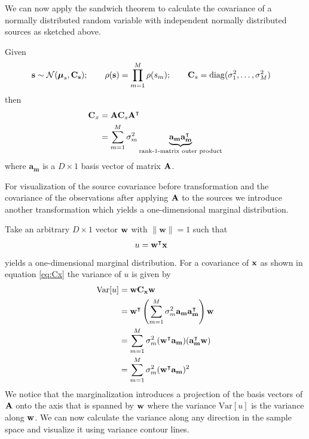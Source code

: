 \noindent We can now apply the sandwich theorem to calculate the covariance of a normally distributed random
variable with independent normally distributed sources as sketched above.
\begin{proposition}
Given
	\begin{align*}
		\mathbf{s} \sim \mathcal{N}(\mathbf{\boldsymbol \mu}_s,\mathbf{C_s}); \qquad
		\rho(\mathbf{s}) = \prod_{m=1}^M \rho(s_m); \qquad
		\mathbf{C}_s = \mathrm{diag}(\sigma_1^2, \dots ,\sigma_M^2) &
	\end{align*}
then
	\begin{align}
		\begin{split}
		\mathbf{C}_x &= \mathbf{A} \mathbf{C}_s \mathbf{A}^\intercal \\
		             &= \sum_{m=1}^M \sigma_m^2 \underbrace{\mathbf{a_m a_m^\intercal}}_{\text{rank-1-matrix outer product}}
		             \label{eq:Cx}
		\end{split}
	\end{align}
where $\mathbf{a_m}$ is a $D \times 1$ basis vector of matrix $\mathbf{A}$.
\end{proposition}

\noindent For visualization of the source covariance before transformation and the covariance of the observations
after applying $\mathbf{A}$ to the sources we introduce another transformation which yields a one-dimensional 
marginal distribution.

\begin{proposition}
Take an arbitrary $D \times 1$ vector $\mathbf{w}$ with $\|\mathbf{w}\| = 1$ such that
	\begin{align}
		&u = \mathbf{w^\intercal x}
	\end{align}
\noindent yields a one-dimensional marginal distribution. For a covariance of $\mathbf{x}$ as shown in equation
\eqref{eq:Cx} the variance of $u$ is given by
\begin{align}
\begin{split}
	\mathrm{Var}[u] &= \mathbf{w C_x w} \\
	                          &= \mathbf{w}^\intercal \left(\sum_{m=1}^M \sigma_m^2 \mathbf{a_m a_m^\intercal}\right) \mathbf{w} \\
	                          &= \sum_{m=1}^M \sigma_m^2 (\mathbf{w^\intercal a_m}) (\mathbf{a_m^\intercal w}) \\
	                          &= \sum_{m=1}^M \sigma_m^2 (\mathbf{w^\intercal a_m})^2 \label{eq:Cu}
\end{split}
\end{align}
We notice that the marginalization introduces a projection of the basis vectors of $\mathbf{A}$ onto the axis that is
spanned by $\mathbf{w}$ where the variance $\mathrm{Var}[u]$ is the variance along $\mathbf{w}$. We can now calculate 
the variance along any direction in the sample space and visualize it using variance contour lines.
\end{proposition}

